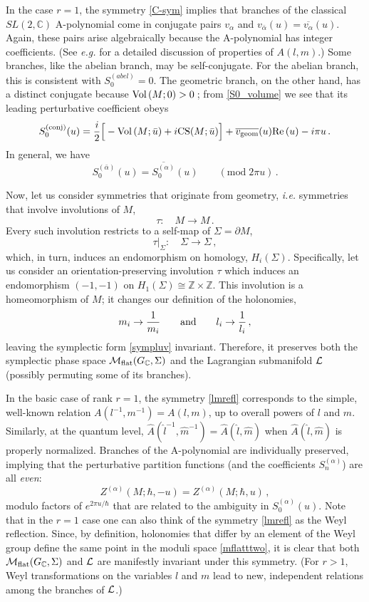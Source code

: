 \documentclass[hyper]{JHEP3}
\renewcommand{\Re}{{\rm Re}\,}
\def\CL {{\cal L}}
\newcommand{\C}{{\mathbb{C}}}
\newcommand{\Z}{{\mathbb{Z}}}
\newcommand{\M}{{{\cal M}}_{{\rm flat}}}
\newcommand\be{\begin{equation}}
\newcommand\ee{\end{equation}}
\newcommand{\Vol}{{\mbox{Vol\,}}}
\begin{document}
In the case $r=1$, the symmetry \eqref{C-sym} implies that branches of the classical $SL(2,\C)$ A-polynomial come in conjugate pairs $v_\alpha$ and $v_{\bar{\alpha}}(u)=\overline{v_\alpha}(u)$. Again, these pairs arise algebraically because the A-polynomial has integer coefficients.
 (See {\it e.g.} \cite{cooper-1994, cooper-1996} for a detailed discussion
of properties of $A(l,m)$.)  Some branches, like the abelian branch, may be self-conjugate. For the abelian branch, this is consistent with $S_0^{(abel)}=0$. The geometric branch, on the other hand, has a distinct conjugate because $\Vol(M;0)>0$\,; from \eqref{S0_volume} we see that its leading perturbative coefficient obeys
%
\be
S_0^{({\rm conj})}(u)
= \frac{i}{2}\Big[ - \Vol (M;\bar{u}) + i {\rm CS} (M;\bar{u}) \Big]
+\overline{v_{{\rm geom}}} (u) \Re(u) - i\pi u\,.
\label{S0_conj}
\ee
%
In general, we have
%
\be
S_0^{(\bar{\alpha})}(u) = \overline{S_0^{(\alpha)}}(u)
\qquad (\mbox{mod}\;2\pi u)\,.
\ee


Now, let us consider symmetries that originate from geometry,
{\it i.e.} symmetries that involve involutions of $M$,
\be
\tau : \quad M \to M\,.
\ee
Every such involution restricts to a self-map of $\Sigma = \partial M$,
\be
\tau \vert_{\Sigma} : \quad \Sigma \to \Sigma\,,
\ee
which, in turn, induces an endomorphism on homology, $H_i (\Sigma)$.
Specifically, let us consider an orientation-preserving involution $\tau$
which induces an endomorphism $(-1,-1)$ on $H_1 (\Sigma) \cong \Z \times \Z$.
This involution is a homeomorphism of $M$;
it changes our definition of the holonomies,
\be
m_i \to \frac{1}{m_i}
\qquad {\rm and} \qquad
l_i \to \frac{1}{l_i}\,,
\label{lmrefl}
\ee
leaving the symplectic form \eqref{sympluv} invariant.
Therefore, it preserves both the symplectic phase space $\M (G_{\C}, \Sigma)$
and the Lagrangian submanifold $\CL$ (possibly permuting some of its branches).


In the basic case of rank $r=1$, the symmetry \eqref{lmrefl} corresponds to the simple, well-known relation $A(l^{-1},m^{-1})=A(l,m)$,
up to overall powers of $l$ and $m$. Similarly, at the quantum level, $\widehat{A}(\hat{l}^{-1},\hat{m}^{-1}) = \widehat{A}(\hat{l},\hat{m})$ when $\widehat{A}(\hat{l},\hat{m})$ is properly normalized. Branches of the A-polynomial are individually preserved, implying that the perturbative partition functions (and the coefficients $S_n^{(\alpha)}$) are all \emph{even}:
%
\be Z^{(\alpha)}(M;\hbar,-u) = Z^{(\alpha)}(M;\hbar,u)\,, \label{even} \ee
%
modulo factors of $e^{2\pi u/\hbar}$ that are related to the ambiguity in $S_0^{(\alpha)}(u)$. Note that in the $r=1$ case one can also think of the symmetry \eqref{lmrefl} as the Weyl reflection.
Since, by definition, holonomies that differ by an element of the Weyl group
define the same point in the moduli space \eqref{mflatttwo}, it is clear that
both $\M (G_{\C},\Sigma)$ and $\CL$ are manifestly invariant under this symmetry. (For $r>1$, Weyl transformations on the variables $l$ and $m$ lead to new, independent relations among the branches of $\cal L$.)
\end{document}
